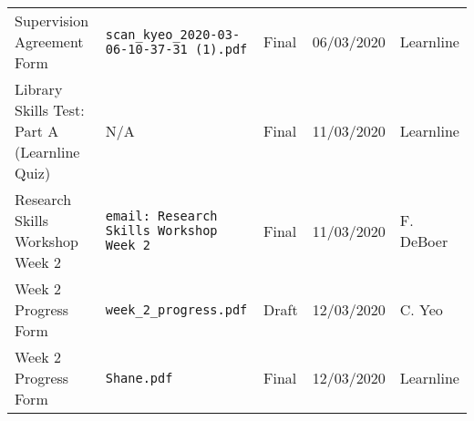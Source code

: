 \documentclass[10pt, landscape]{article}
\begin{document}
\begin{tabular}{p{7cm}p{10cm}p{1.5cm}p{2cm}p{2cm}}
	Supervision Agreement Form						& \verb|scan_kyeo_2020-03-06-10-37-31 (1).pdf|								& Final				& 06/03/2020			& Learnline\\
	
	Library Skills Test: Part A (Learnline Quiz)	& N/A																		& Final 			& 11/03/2020		 	& Learnline\\
	
	Research Skills Workshop Week 2					& \verb|email: Research Skills Workshop Week 2|								& Final				& 11/03/2020		 	& F. DeBoer\\
	
	Week 2 Progress Form							& \verb|week_2_progress.pdf|												& Draft				& 12/03/2020			& C. Yeo\\
	
	Week 2 Progress Form							& \verb|Shane.pdf|															& Final				& 12/03/2020			& Learnline\\
	\bottomrule
	\end{tabular}
\end{document}
